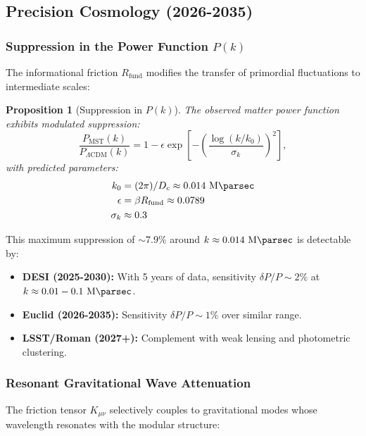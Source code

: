 \documentclass[11pt, a4paper]{article}
\theoremstyle{plain}
\newtheorem{proposition}[theorem]{Proposition}
\theoremstyle{definition}
\newcommand{\Rfactor}{R_{\text{fund}}}
\begin{document}
\subsection{Precision Cosmology (2026-2035)}

\subsubsection{Suppression in the Power Function \texorpdfstring{$P(k)$}{P(k)}}

The informational friction $\Rfactor$ modifies the transfer of primordial fluctuations to intermediate scales:

\begin{proposition}[Suppression in $P(k)$]
The observed matter power function exhibits modulated suppression:
\begin{equation}
\frac{P_{\text{MST}}(k)}{P_{\Lambda\text{CDM}}(k)} = 1 - \epsilon \exp\left[-\left(\frac{\log(k/k_0)}{\sigma_k}\right)^2\right],
\end{equation}
with predicted parameters:
\begin{align*}
k_0 &= (2\pi)/D_c \approx 0.014\ \si{\per\mega\parsec} \\
\epsilon &= \beta\Rfactor \approx 0.0789 \\
\sigma_k &\approx 0.3
\end{align*}
\end{proposition}

This maximum suppression of $\sim 7.9\%$ around $k \approx 0.014\ \si{\per\mega\parsec}$ is detectable by:

\begin{itemize}
    \item \textbf{DESI (2025-2030):} With 5 years of data, sensitivity $\delta P/P \sim 2\%$ at $k \approx 0.01-0.1\ \si{\per\mega\parsec}$.
    \item \textbf{Euclid (2026-2035):} Sensitivity $\delta P/P \sim 1\%$ over similar range.
    \item \textbf{LSST/Roman (2027+):} Complement with weak lensing and photometric clustering.
\end{itemize}

\subsubsection{Resonant Gravitational Wave Attenuation}

The friction tensor $K_{\mu\nu}$ selectively couples to gravitational modes whose wavelength resonates with the modular structure:
\end{document}
